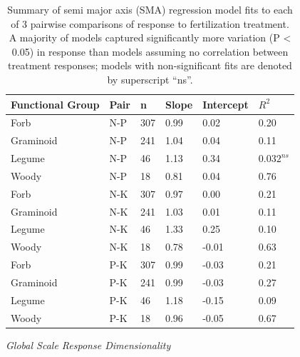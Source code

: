 \documentclass[twoside,12pt,final]{ucthesis-CA2012}
\begin{document}
\begin{ucmainmatter}
\begin{figure}
\end{figure}
\begin{table}[ht]
\centering
\begin{tabular}{llllll}
 Functional Group & Pair & n & Slope & Intercept & $R^2$ \\ 
  \hline
Forb & N-P & 307 & 0.99 & 0.02 & 0.20 \\ 
  Graminoid & N-P & 241 & 1.04 & 0.04 & 0.11 \\ 
  Legume & N-P & 46 & 1.13 & 0.34 & $0.032^{ns}$ \\ 
  Woody & N-P & 18 & 0.81 & 0.04 & 0.76 \\ 
   \hline
Forb & N-K & 307 & 0.97 & 0.00 & 0.21 \\ 
  Graminoid & N-K & 241 & 1.03 & 0.01 & 0.11 \\ 
  Legume & N-K & 46 & 1.33 & 0.25 & 0.10 \\ 
  Woody & N-K & 18 & 0.78 & -0.01 & 0.63 \\ 
   \hline
Forb & P-K & 307 & 0.99 & -0.03 & 0.21 \\ 
  Graminoid & P-K & 241 & 0.99 & -0.03 & 0.27 \\ 
  Legume & P-K & 46 & 1.18 & -0.15 & 0.09 \\ 
  Woody & P-K & 18 & 0.96 & -0.05 & 0.67 \\ 
  \end{tabular}
\caption{Summary of semi major axis (SMA) regression model fits to each of 3 pairwise comparisons of response to fertilization treatment. A majority of models captured significantly more variation (P < 0.05) in response than models assuming no correlation between treatment responses; models with non-significant fits are denoted by superscript “ns”.} 
\end{table}
\emph{Global Scale Response Dimensionality}


\end{ucmainmatter}
\end{document}
